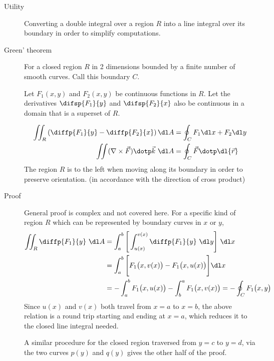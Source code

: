 \begin{description}
    \item[Utility] Converting a double integral over a region $ R $ into a line integral
        over its boundary in order to simplify computations.

    \item[Green' theorem] For a closed region $ R $ in 2 dimensions bounded by a finite
        number of smooth curves. Call this boundary $ C $. \par
        Let $ F_1(x, y) $ and $ F_2(x, y) $ be continuous functions in $ R $. Let the
        derivatives $ \difsp{F_1}{y} $ and $ \difsp{F_2}{x} $ also be continuous in a
        domain that is a superset of $ R $.

        \begin{align}
            \iint_R \left( \diffp{F_1}{y} - \diffp{F_2}{x} \right) \dl A & =
            \oint_C F_1 \dl x + F_2 \dl y                                    \\
            \iint (\nabla \times \vec{F}) \dotp \vec{k}\ \dl A           & =
            \oint_C \vec{F} \dotp \dl{\vec{r}}
        \end{align}
        The region $ R $ is to the left when moving along its boundary in order to
        preserve orientation. (in accordance with the direction of cross product)

    \item[Proof] General proof is complex and not covered here. For a specific kind of
        region $ R $ which can be represented by boundary curves in $ x $ or $ y $,
        \begin{align}
            \iint_R \diffp {F_1}{y}\ \dl A & = \int_{a}^{b} \Bigg[
            \int_{u(x)}^{v(x)} \diffp{F_1}{y}\ \dl y \Bigg]\ \dl x                   \\
                                           & = \int_{a}^{b} \Bigg[F_1
            \big( x, v(x) \big) - F_1 \big( x, u(x) \big) \Bigg] \dl x               \\
                                           & = -\int_{a}^{b} F_1 \big( x, u(x) \big)
            - \int_{b}^{a} F_1 \big( x, v(x) \big) = -\oint_C F_1 \big( x, y \big)
        \end{align}
        Since $ u(x) $ and $ v(x) $ both travel from $ x = a $ to $ x = b $, the above
        relation is a round trip starting and ending at $ x = a $, which reduces it
        to the closed line integral needed. \par
        A similar procedure for the closed region traversed from $ y = c $ to $ y = d $,
        via the two curves $ p(y) $ and $ q(y) $ gives the other half of the proof. \par


\end{description}
